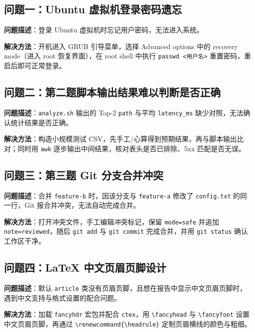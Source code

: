 \documentclass[a4paper, 12pt]{article}
\begin{document}
\subsection{问题一：Ubuntu 虚拟机登录密码遗忘}

\textbf{问题描述}：登录 Ubuntu 虚拟机时忘记用户密码，无法进入系统。

\textbf{解决方法}：开机进入 GRUB 引导菜单，选择 Advanced options 中的 recovery mode（进入 root 恢复界面），在 root shell 中执行 \texttt{passwd <用户名>} 重置密码，重启后即可正常登录。

\subsection{问题二：第二题脚本输出结果难以判断是否正确}

\textbf{问题描述}：\texttt{analyze.sh} 输出的 Top-2 \texttt{path} 与平均 \texttt{latency\_ms} 缺少对照，无法确认统计结果是否正确。

\textbf{解决方法}：构造小规模测试 CSV，先手工/心算得到预期结果，再与脚本输出比对；同时用 \texttt{awk} 逐步输出中间结果，核对表头是否已排除、5xx 匹配是否无误。

\subsection{问题三：第三题 Git 分支合并冲突}

\textbf{问题描述}：合并 \texttt{feature-b} 时，因该分支与 \texttt{feature-a} 修改了 \texttt{config.txt} 的同一行，Git 报合并冲突，无法自动完成合并。

\textbf{解决方法}：打开冲突文件，手工编辑冲突标记，保留 \texttt{mode=safe} 并追加 \texttt{note=reviewed}，随后 \texttt{git add} 与 \texttt{git commit} 完成合并，并用 \texttt{git status} 确认工作区干净。

\subsection{问题四：\LaTeX{} 中文页眉页脚设计}

\textbf{问题描述}：默认 \texttt{article} 类没有页眉页脚，且想在报告中显示中文页眉页脚时，遇到中文支持与格式设置的配合问题。

\textbf{解决方法}：加载 \texttt{fancyhdr} 宏包并配合 \texttt{ctex}，用 \texttt{\textbackslash fancyhead} 与 \texttt{\textbackslash fancyfoot} 设置中文页眉页脚，再通过 \texttt{\textbackslash renewcommand\{\textbackslash headrule\}} 定制页眉横线的颜色与粗细。
\end{document}
